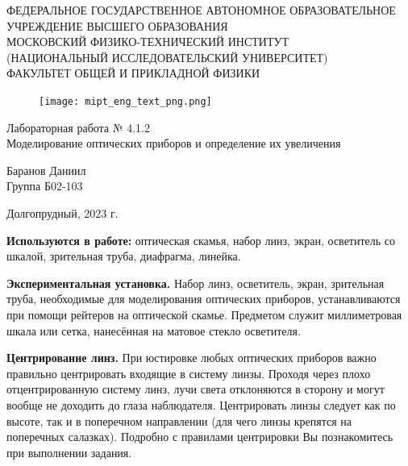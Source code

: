 \documentclass[a4paper,12pt]{article} %
\begin{document}
\begin{center}
	\footnotesize{ФЕДЕРАЛЬНОЕ ГОСУДАРСТВЕННОЕ АВТОНОМНОЕ ОБРАЗОВАТЕЛЬНОЕ 			УЧРЕЖДЕНИЕ ВЫСШЕГО ОБРАЗОВАНИЯ}\\
	\footnotesize{МОСКОВСКИЙ ФИЗИКО-ТЕХНИЧЕСКИЙ ИНСТИТУТ\\(НАЦИОНАЛЬНЫЙ 			ИССЛЕДОВАТЕЛЬСКИЙ УНИВЕРСИТЕТ)}\\
	\footnotesize{ФАКУЛЬТЕТ ОБЩЕЙ И ПРИКЛАДНОЙ ФИЗИКИ\\}
	\hfill \break
	\hfill \break
	\hfill \break
	\hfill \break
\end{center}


\begin{figure}[h]
    \centering
    \texttt{[image: mipt\_eng\_text\_png.png]}
    \label{fig:my_label}
\end{figure}


\begin{center}   
    \hfill \break
	\hfill \break
	\hfill \break
	\large{Лабораторная работа № 4.1.2\\ \hfill \break\Large{Моделирование оптических приборов и определение их увеличения}}\\
	\hfill \break
	\hfill \break
	\hfill \break
	\begin{flushright}
		Баранов Даниил\\
		Группа Б02-103
	\end{flushright}
	\hfill \break
	\hfill \break
	\hfill \break
\end{center}
\hfill \break
\hfill \break
\hfill \break
\hfill \break
\begin{center}
	Долгопрудный, 2023 г.
\end{center}
\thispagestyle{empty}

\newpage

\textbf{Используются в работе:}  оптическая скамья, набор линз, экран, осветитель со шкалой, зрительная труба, диафрагма, линейка.

\textbf{Экспериментальная установка.} Набор линз, осветитель, экран, зрительная труба, необходимые для моделирования оптических приборов, устанавливаются при помощи рейтеров на оптической скамье. Предметом служит миллиметровая шкала или сетка, нанесённая на матовое стекло осветителя.

\textbf{Центрирование линз.} При юстировке любых оптических приборов важно правильно центрировать входящие в систему линзы. Проходя через плохо отцентрированную систему линз, лучи света отклоняются в сторону и могут вообще не доходить до глаза наблюдателя. Центрировать линзы следует как по высоте, так и в поперечном направлении (для чего линзы крепятся на поперечных салазках). Подробно с правилами центрировки Вы познакомитесь при выполнении задания.
\end{document}
